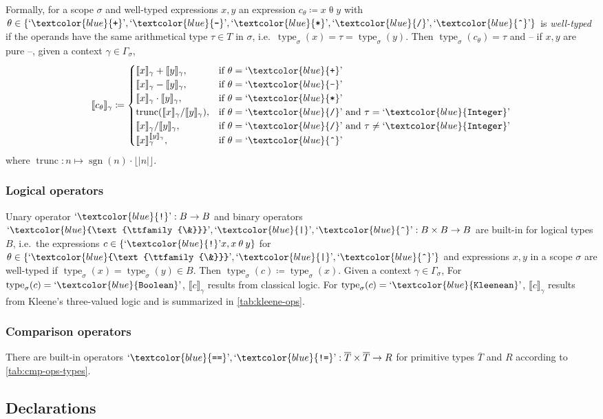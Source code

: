 \documentclass[a4paper,11pt,parskip=half]{scrartcl}
\newcommand*\lang[1]{\text`\textcolor{blue}{\text{\ttfamily{#1}}}\text'{}}
\newcommand*\ctxval[2][\gamma]{\llbracket{#2}\rrbracket_{#1}}
\newcommand*\sctype[2][\sigma]{\operatorname{type}_{#1}(#2)}
\begin{document}
Formally, for a scope $\sigma$ and well-typed expressions $x,y$
an expression $c_\theta\coloneqq x\mathbin\theta y$ with
$\theta\in\{\lang+,\lang-,\lang*,\lang/,\lang{\^{}}\}$ is \emph{well-typed}
if the operands have the same arithmetical type
$\tau\in T$ in $\sigma$,
i.e.\ $\operatorname{type}_\sigma(x)=\tau=\operatorname{type}_\sigma(y)$.
Then $\operatorname{type}_\sigma(c_\theta)=\tau$ and -- if $x,y$ are pure --, given
a context $\gamma\in\Gamma_\sigma$,
\[ \ctxval{c_\theta}\coloneqq\begin{cases}
      \ctxval x+\ctxval y,&\text{if}~\theta=\lang+ \\
      \ctxval x-\ctxval y,&\text{if}~\theta=\lang- \\
      \ctxval x\cdot\ctxval y,&\text{if}~\theta=\lang* \\
      \operatorname{trunc}(\ctxval x/\ctxval y),&\text{if}~\theta=\lang/~\text{and}~\tau=\lang{Integer} \\
      \ctxval x/\ctxval y,&\text{if}~\theta=\lang/~\text{and}~\tau\neq\lang{Integer} \\
      \ctxval x^{\ctxval y},&\text{if}~\theta=\lang{\^{}}
   \end{cases} \]
where $\operatorname{trunc}:n\mapsto\operatorname{sgn}(n)\cdot\lfloor|n|\rfloor$.

\subsubsection{Logical operators}
Unary operator $\lang!:B\to B$ and
binary operators $\lang\&,\lang|,\lang{\^{}}:B\times B\to B$
are built-in for logical types $B$, i.e.\ the expressions
$c\in\{\lang!x,x\mathbin\theta y\}$
for $\theta\in\{\lang\&,\lang|,\lang{\^{}}\}$ and expressions $x,y$
in a scope $\sigma$ are well-typed if $\sctype x=\sctype y\in B$.
Then $\sctype c\coloneqq\sctype x$. Given a context $\gamma\in\Gamma_\sigma$, 
For $\sctype c=\lang{Boolean}$, $\ctxval c$ results from classical logic.
For $\sctype c=\lang{Kleenean}$, $\ctxval c$ results from Kleene's
three-valued logic and is summarized in \cref{tab:kleene-ops}.

\subsubsection{Comparison operators}
There are built-in operators
$\lang{==},\lang{!=}:\overline T\times\overline  T\to R$
for primitive types $\overline T$
and $R$ according to \cref{tab:cmp-ops-types}.

\subsection{Declarations}
\end{document}
